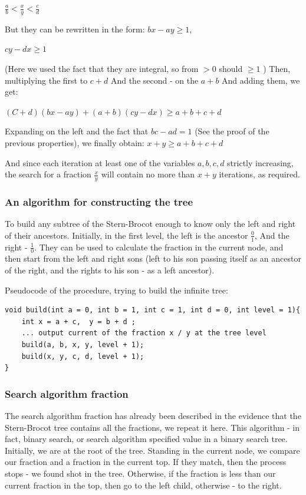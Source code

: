 $\frac {a} {b} <\frac {x} {y} <\frac {c} {d}$

But they can be rewritten in the form:
$bx-ay \ge 1,$

$cy-dx \ge 1$

(Here we used the fact that they are integral, so from $> 0$ should $\ge 1$ )
Then, multiplying the first to $c + d$ And the second - on the $a + b$ And adding them, we get:

$(C + d) (bx-ay) + (a + b) (cy-dx) \ge a + b + c + d$

Expanding on the left and the fact that $bc-ad = 1$ (See the proof of the previous properties), we finally obtain:
$x + y \ge a + b + c + d$

And since each iteration at least one of the variables $a, b, c, d$ strictly increasing, the search for a fraction $\frac {x} {y}$ will contain no more than $x + y$ iterations, as required.
\subsubsection{ An algorithm for constructing the tree }

To build any subtree of the Stern-Brocot enough to know only the left and right of their ancestors. Initially, in the first level, the left is the ancestor $\frac {0} {1}$, And the right - $\frac {1} {0}$. They can be used to calculate the fraction in the current node, and then start from the left and right sons (left to his son passing itself as an ancestor of the right, and the rights to his son - as a left ancestor).

Pseudocode of the procedure, trying to build the infinite tree:

\begin{verbatim}
void build(int a = 0, int b = 1, int c = 1, int d = 0, int level = 1){
    int x = a + c,  y = b + d ;
    ... output current of the fraction x / y at the tree level
    build(a, b, x, y, level + 1);
    build(x, y, c, d, level + 1);
} 
\end{verbatim}
\subsubsection{ Search algorithm fraction }

The search algorithm fraction has already been described in the evidence that the Stern-Brocot tree contains all the fractions, we repeat it here. This algorithm - in fact, binary search, or search algorithm specified value in a binary search tree. Initially, we are at the root of the tree. Standing in the current node, we compare our fraction and a fraction in the current top. If they match, then the process stops - we found shot in the tree. Otherwise, if the fraction is less than our current fraction in the top, then go to the left child, otherwise - to the right.

